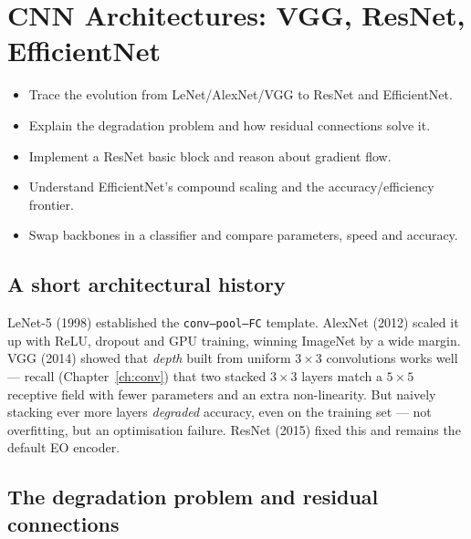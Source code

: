 \chapter{CNN Architectures: VGG, ResNet, EfficientNet}
\label{ch:arch}


\begin{objbox}
\begin{itemize}[leftmargin=1.2em,nosep]
  \item Trace the evolution from LeNet/AlexNet/VGG to ResNet and EfficientNet.
  \item Explain the degradation problem and how residual connections solve it.
  \item Implement a ResNet basic block and reason about gradient flow.
  \item Understand EfficientNet's compound scaling and the accuracy/efficiency frontier.
  \item Swap backbones in a classifier and compare parameters, speed and accuracy.
\end{itemize}
\end{objbox}

\section{A short architectural history}

LeNet-5 (1998) established the \texttt{conv--pool--FC} template. AlexNet (2012)
scaled it up with ReLU, dropout and GPU training, winning ImageNet by a wide
margin. VGG (2014) showed that \emph{depth} built from uniform $3\times3$
convolutions works well --- recall (Chapter~\ref{ch:conv}) that two stacked
$3\times3$ layers match a $5\times5$ receptive field with fewer parameters and
an extra non-linearity. But naively stacking ever more layers \emph{degraded}
accuracy, even on the training set --- not overfitting, but an optimisation
failure. ResNet (2015) fixed this and remains the default EO encoder.

\section{The degradation problem and residual connections}

